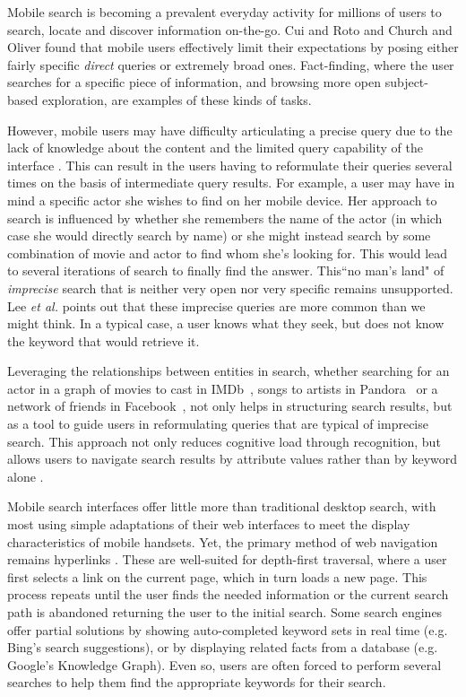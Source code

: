 Mobile search is becoming a prevalent everyday activity for millions of users to search, locate and discover information on-the-go.  Cui and Roto \cite{Cui:2008} and Church and Oliver \cite{Church:2011} found that mobile users effectively limit their expectations by posing either fairly specific \textit{direct} queries or extremely broad ones. Fact-finding, where the user searches for a specific piece of information, and browsing more open subject-based exploration, are examples of these kinds of tasks. 

However, mobile users may have difficulty articulating a precise query due to the lack of knowledge about the content and the limited query capability of the interface \cite{Kamvar:2009}. This can result in the users having to reformulate their queries several times on the basis of intermediate query results. For example, a user may have in mind a specific actor she
wishes to find on her mobile device. Her approach to search is influenced by whether she remembers the name of the actor
(in which case she would directly search by name) or she might instead search by some combination of movie and actor to find whom she's looking for.  This would lead to several iterations of search to finally find the answer. This``no man's land" of \textit{imprecise} search that is neither very open nor very specific remains unsupported. Lee \textit{et al.} \cite{Lee:2012} points out that these imprecise queries are more common than we might think. In a typical case, a user knows what they seek, but does not know the keyword that would retrieve it.

Leveraging the relationships between entities in search, whether searching for an actor in a graph of movies to cast in IMDb~\cite{imdb}, songs to artists in Pandora~\cite{pandora} or a network of friends in Facebook~\cite{Facebook}, not only helps in structuring search results, but as a tool to guide users in reformulating queries that are typical of imprecise search. This approach not only reduces cognitive load through recognition, but allows users to navigate search results by attribute values rather than by keyword alone \cite{Hearst:2002}.

Mobile search interfaces offer little more than traditional desktop search, with most using simple adaptations of their web interfaces to meet the display characteristics of
mobile handsets. Yet, the primary method of web navigation remains hyperlinks \cite{206540}.  These are well-suited for depth-first traversal, where a user first selects a link on the current page, which in turn loads a new page. This process repeats until the user finds the needed information or the current search path is abandoned returning the user to the initial search. Some search engines offer partial solutions by showing auto-completed keyword sets in real time (e.g. Bing's search suggestions), or by displaying related facts from a database (e.g. Google's Knowledge Graph). Even so, users are often forced to perform several searches to help them find the appropriate keywords for their search.


